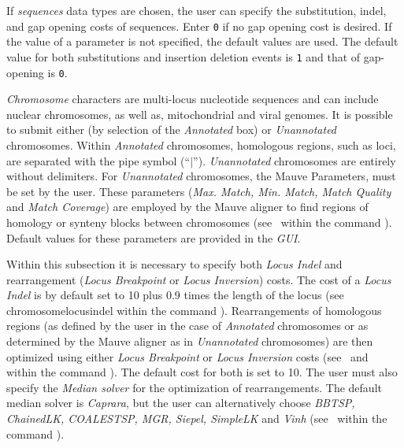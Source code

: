  
\begin{description}
\setlength{\labelsep}{5pt}
\setlength{\itemindent}{0pt}%
\setlength{\parindent}{0.5cm}        
        
	\item [Sequence Parameters]  If \emph{sequences} data types are chosen, the user can specify the 
		substitution, indel, and gap opening costs of sequences. Enter \texttt{0} if no gap opening 
		cost is desired. If the value of a parameter is not specified, the default values are used. 
		The default value for both substitutions and insertion deletion events is \texttt{1} and 
		that of gap-opening is \texttt{0}. 

	\item [Chromosome and Mauve Parameters] \emph{Chromosome} characters are multi-locus 
		nucleotide sequences and can include nuclear chromosomes, as well as, mitochondrial 
		and viral genomes.  It is possible to submit either  (by selection of the 
		\emph{Annotated} box) or \emph{Unannotated} chromosomes. Within \emph{Annotated} 
		chromosomes, homologous regions, such as loci, are separated with the pipe symbol
		(``$\vert$'').  \emph{Unannotated} chromosomes are entirely 
		without delimiters. For \emph{Unannotated} chromosomes, the Mauve Parameters, must be set
		by the user.  These parameters (\emph{Max. Match, Min. Match, Match Quality} and \emph {Match 
		Coverage}) are employed by the Mauve aligner to find regions of homology or synteny blocks 
		 between chromosomes (see~ within the 
		 command ). Default values for these parameters are provided in the \emph{GUI}.
		    	
		\indent Within this subsection it is necessary to specify both \emph{Locus Indel} and rearrangement 
		(\emph{Locus Breakpoint} or \emph{Locus Inversion}) costs.  The cost of a \emph{Locus Indel} 
		is by default set to 10 plus 0.9 times the length of the locus (see~
		{chromosomelocusindel}  within the command ). Rearrangements of 
		homologous regions (as defined by the user in the case of \emph{Annotated} chromosomes 
		or as determined by the Mauve aligner as in \emph{Unannotated} chromosomes) are 
		then optimized using either \emph{Locus Breakpoint} or \emph{Locus Inversion} costs 
		(see~ and
		~ within the command 
		).  The default cost for both is set to 10. The user must also specify the 
		\emph{Median solver} for the optimization of rearrangements. The default median solver is 
		\emph{Caprara}, but the user can alternatively choose \emph{BBTSP, ChainedLK, COALESTSP, 
		MGR, Siepel, SimpleLK} and \emph{Vinh} (see~ 
		within the command ).
		

\end{description}
